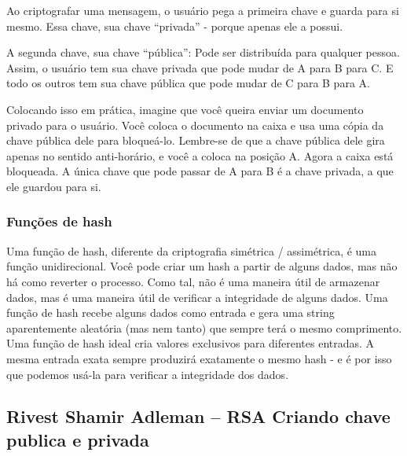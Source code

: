 Ao criptografar uma mensagem, o usuário pega a primeira chave e guarda para si mesmo. Essa chave, sua chave ``privada'' - porque apenas ele a possui.

A segunda chave, sua chave ``pública'': Pode ser distribuída para qualquer pessoa. Assim, o usuário tem sua chave privada que pode mudar de A para B para C. E todo os outros tem sua chave pública que pode mudar de C para B para A.

Colocando isso em prática, imagine que você queira enviar um documento privado para o usuário. Você coloca o documento na caixa e usa uma cópia da chave pública dele para bloqueá-lo. Lembre-se de que a chave pública dele gira apenas no sentido anti-horário, e você a coloca na posição A. Agora a caixa está bloqueada. A única chave que pode passar de A para B é a chave privada, a que ele guardou para si.

\subsubsection{Funções de hash}
Uma função de hash, diferente da criptografia simétrica / assimétrica, é uma função unidirecional. Você pode criar um hash a partir de alguns dados, mas não há como reverter o processo. Como tal, não é uma maneira útil de armazenar dados, mas é uma maneira útil de verificar a integridade de alguns dados.
Uma função de hash recebe alguns dados como entrada e gera uma string aparentemente aleatória (mas nem tanto) que sempre terá o mesmo comprimento. Uma função de hash ideal cria valores exclusivos para diferentes entradas. A mesma entrada exata sempre produzirá exatamente o mesmo hash - e é por isso que podemos usá-la para verificar a integridade dos dados.

\subsection{Rivest Shamir Adleman – RSA Criando chave publica e privada}


